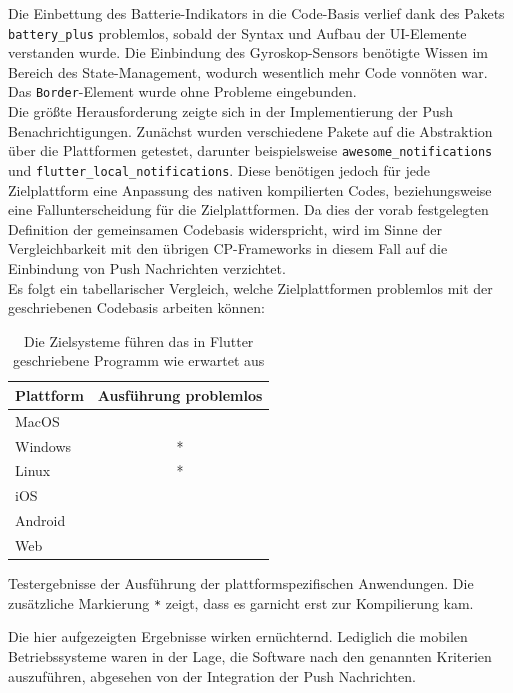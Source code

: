 \documentclass[a4paper]{scrartcl}
\newcommand{\xmark}{\ding{55}}
\begin{document}
Die Einbettung des Batterie-Indikators in die Code-Basis verlief dank des Pakets \texttt{battery\_plus} problemlos, sobald der Syntax und Aufbau der UI-Elemente verstanden wurde. Die Einbindung des Gyroskop-Sensors benötigte Wissen im Bereich des State-Management, wodurch wesentlich mehr Code vonnöten war. Das \texttt{Border}-Element wurde ohne Probleme eingebunden. \\
Die größte Herausforderung zeigte sich in der Implementierung der Push Benachrichtigungen. Zunächst wurden verschiedene Pakete auf die Abstraktion über die Plattformen getestet, darunter beispielsweise \texttt{awesome\_notifications} und \texttt{flutter\_local\_notifications}. Diese benötigen jedoch für jede Zielplattform eine Anpassung des nativen kompilierten Codes, beziehungsweise eine Fallunterscheidung für die Zielplattformen. Da dies der vorab festgelegten Definition der gemeinsamen Codebasis widerspricht, wird im Sinne der Vergleichbarkeit mit den übrigen CP-Frameworks in diesem Fall auf die Einbindung von Push Nachrichten verzichtet. \\

Es folgt ein tabellarischer Vergleich, welche Zielplattformen problemlos mit der geschriebenen Codebasis arbeiten können:

\begin{table}[H]
 	\centering
 	\caption{Die Zielsysteme führen das in Flutter geschriebene Programm wie erwartet aus}
 	\begin{center}
 		\begin{tabular}{| l | c |}
 			\hline
 			\textbf{Plattform} & \textbf{Ausführung problemlos} \\
 			\hline \hline
			MacOS & \xmark \\
 			\hline
 			Windows & \xmark * \\
 			\hline
 			Linux & \xmark * \\
 			\hline
 			iOS & \Checkmark \\
 			\hline
 			Android & \Checkmark \\
 			\hline
 			Web & \xmark \\
 			\hline
 		\end{tabular}
 	\end{center}
 	Testergebnisse der Ausführung der plattformspezifischen Anwendungen. Die zusätzliche Markierung \texttt{*} zeigt, dass es garnicht erst zur Kompilierung kam.
\end{table}

Die hier aufgezeigten Ergebnisse wirken ernüchternd. Lediglich die mobilen Betriebssysteme waren in der Lage, die Software nach den genannten Kriterien auszuführen, abgesehen von der Integration der Push Nachrichten. \\
\end{document}
